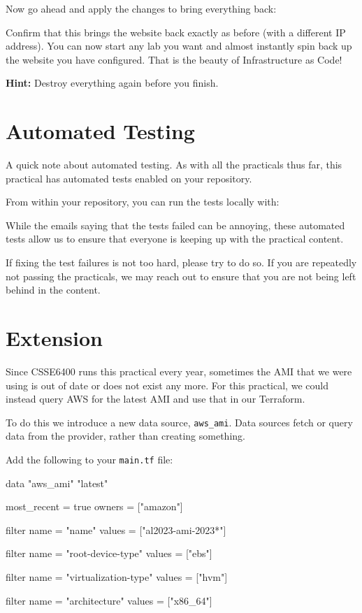 \documentclass{csse4400}
\begin{document}
Now go ahead and apply the changes to bring everything back:

Confirm that this brings the website back exactly as before (with a different IP address).
You can now start any lab you want and almost instantly spin back up the website you have configured.
That is the beauty of Infrastructure as Code!

\textbf{Hint:} Destroy everything again before you finish.

\section{Automated Testing}
A quick note about automated testing.
As with all the practicals thus far,
this practical has automated tests enabled on your repository.

From within your repository, you can run the tests locally with:

While the emails saying that the tests failed can be annoying,
these automated tests allow us to ensure that everyone is keeping up with the practical content.

If fixing the test failures is not too hard,
please try to do so.
If you are repeatedly not passing the practicals,
we may reach out to ensure that you are not being left behind in the content.

\section{Extension}


Since CSSE6400 runs this practical every year, sometimes the AMI that we were using is out of date or does not exist any more.
For this practical, we could instead query AWS for the latest AMI and use that in our Terraform.

To do this we introduce a new data source, \texttt{aws\_ami}.
Data sources fetch or query data from the provider, rather than creating something.

Add the following to your \texttt{main.tf} file:

\begin{code}[language=terraform,numbers=none]{}
data "aws_ami" "latest" {
  most_recent = true
  owners      = ["amazon"]

  filter {
    name   = "name"
    values = ["al2023-ami-2023*"]
  }

  filter {
    name   = "root-device-type"
    values = ["ebs"]
  }

  filter {
    name   = "virtualization-type"
    values = ["hvm"]
  }

  filter {
    name   = "architecture"
    values = ["x86_64"]
  }
}
\end{code}
\end{document}
